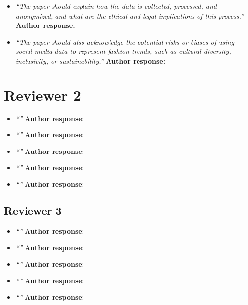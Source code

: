 \documentclass[10pt]{article} %
\begin{document}
\begin{itemize}
	\item {\em ``The paper should explain how the data is collected, processed, and anonymized, and what are the ethical and legal implications of this process.''} \medskip
	\textbf{Author response:} \\
	
	\item {\em ``The paper should also acknowledge the potential risks or biases of using social media data to represent fashion trends, such as cultural diversity, inclusivity, or sustainability.''} \medskip
	\textbf{Author response:} \\	
\end{itemize}

\section*{Reviewer 2}

\begin{itemize}
	\item {\em ``''} \medskip
	\textbf{Author response:} \\
	
	\item {\em ``''} \medskip
	\textbf{Author response:} \\
	
	\item {\em ``''} \medskip
	\textbf{Author response:} \\
	
	\item {\em ``''} \medskip
	\textbf{Author response:} \\
	
	\item {\em ``''} \medskip
	\textbf{Author response:} \\		
\end{itemize}

\subsection*{Reviewer 3}

\begin{itemize}
	\item {\em ``''} \medskip
	\textbf{Author response:} \\
	
	\item {\em ``''} \medskip
	\textbf{Author response:} \\
	
	\item {\em ``''} \medskip
	\textbf{Author response:} \\
	
	\item {\em ``''} \medskip
	\textbf{Author response:} \\
	
	\item {\em ``''} \medskip
	\textbf{Author response:} \\		
\end{itemize}
\end{document}
